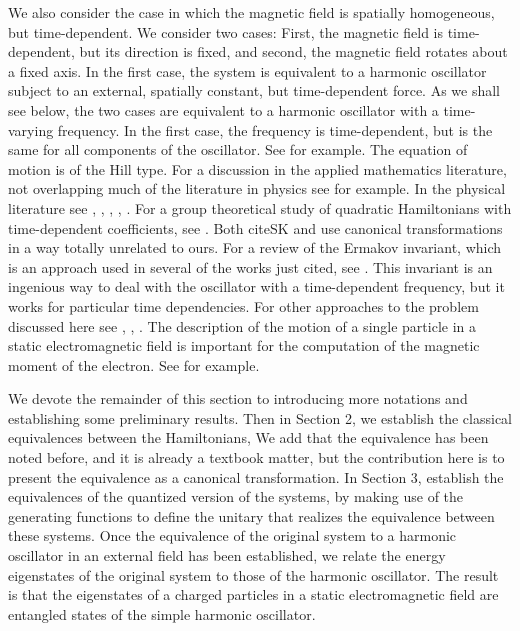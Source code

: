 \documentclass[12pt]{article}
\numberwithin{equation}{section}
\begin{document}
  We also consider the case in which the magnetic field is spatially homogeneous, but time-dependent. We consider two cases: First, the magnetic field is time-dependent, but its direction is fixed, and second, the magnetic field rotates about a fixed axis. In the first case, the system is equivalent to a harmonic oscillator subject to an external, spatially constant, but time-dependent force.  As we shall see below, the two cases are equivalent to a harmonic oscillator with a time-varying frequency. In the first case, the frequency is time-dependent, but is the same for all components of the oscillator. See \cite{MW} for example. The equation of motion is of the Hill type. For a discussion in the applied mathematics literature, not overlapping much of the literature in physics see \cite{MW} for example. In the physical literature  see \cite{K}, \cite{LR}, \cite{GC}, \cite{EG}, \cite{L}. For a group theoretical study of quadratic Hamiltonians with time-dependent coefficients, see \cite{W}. Both cite{SK} and \cite{P} use canonical transformations in a way totally unrelated to ours. For a review of the Ermakov invariant, which is an approach used in several of the works just cited, see \cite{L}.
 This invariant is an ingenious way to deal with the oscillator with a time-dependent frequency, but it works for particular time dependencies.  For other approaches to the problem discussed here see \cite{dJ}, \cite{EB}, \cite{DPR}. The description of the motion of a single particle in a static electromagnetic field is important for the computation of the magnetic moment of the electron. See \cite{BG} for example.
  
We devote the remainder of this section to introducing more notations and establishing some preliminary results. Then in Section 2, we establish the classical equivalences between the Hamiltonians, We add that the equivalence has been noted before, and it is already a textbook matter, but the contribution here is to present the equivalence as a canonical transformation.  In Section 3, establish the equivalences of the quantized version of the systems, by making use of the generating functions to define the unitary that realizes the equivalence between these systems.  Once the equivalence of the original system to a harmonic oscillator in an external field has been established, we relate the energy eigenstates of the original system to those of the harmonic oscillator. The result is that the eigenstates of a charged particles in a static electromagnetic field are entangled states of the simple harmonic oscillator. 
\end{document}
